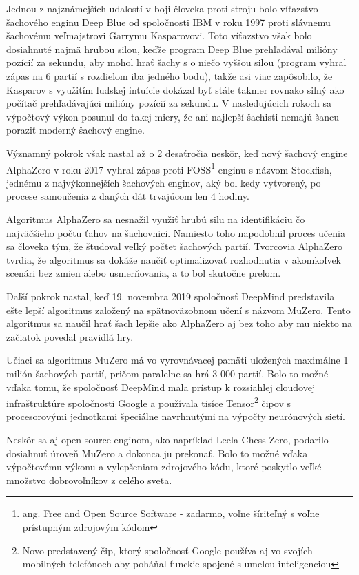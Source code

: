 \documentclass[10pt,oneside,slovak,a4paper]{article}
\begin{document}
Jednou z najznámejších udalostí v boji človeka proti stroju bolo víťazstvo šachového enginu Deep Blue od spoločnosti IBM v roku 1997 proti slávnemu šachovému veľmajstrovi Garrymu Kasparovovi. Toto víťazstvo však bolo dosiahnuté najmä hrubou silou, keďže program Deep Blue prehľadával milióny pozícií za sekundu, aby mohol hrať šachy s o niečo vyššou silou (program vyhral zápas na 6 partií s rozdielom iba jedného bodu), takže asi viac zapôsobilo, že Kasparov s využitím ľudskej intuície dokázal byť stále takmer rovnako silný ako počítač prehľadávajúci milióny pozícií za sekundu. V nasledujúcich rokoch sa výpočtový výkon posunul do takej miery, že ani najlepší šachisti nemajú šancu poraziť moderný šachový engine.\cite{IM20}

Významný pokrok však nastal až o 2 desaťročia neskôr, keď nový šachový engine AlphaZero v roku 2017 vyhral zápas proti FOSS\footnote{ang. Free and Open Source Software - zadarmo, voľne šíriteľný s voľne prístupným zdrojovým kódom} enginu s názvom Stockfish, jednému z najvýkonnejších šachových enginov, aký bol kedy vytvorený, po procese samoučenia z daných dát trvajúcom len 4 hodiny.

Algoritmus AlphaZero sa nesnažil využiť hrubú silu na identifikáciu čo najväčšieho počtu ťahov na šachovnici. Namiesto toho napodobnil proces učenia sa človeka tým, že študoval veľký počtet šachových partií. Tvorcovia AlphaZero tvrdia, že algoritmus sa dokáže naučiť optimalizovať rozhodnutia v akomkoľvek scenári bez zmien alebo usmerňovania, a to bol skutočne prelom.\cite{IM20}

Daľší pokrok nastal, keď 19. novembra 2019 spoločnosť DeepMind predstavila ešte lepší algoritmus založený na spätnoväzobnom učení s názvom MuZero. Tento algoritmus sa naučil hrať šach lepšie ako AlphaZero aj bez toho aby mu niekto na začiatok povedal pravidlá hry.

Učiaci sa algoritmus MuZero má vo vyrovnávacej pamäti uložených maximálne 1 milión šachových partií, pričom paralelne sa hrá 3 000 partií.\cite{IM20} Bolo to možné vďaka tomu, že spoločnosť DeepMind mala prístup k rozsiahlej cloudovej infraštruktúre spoločnosti Google a používala tisíce Tensor\footnote{Novo predstavený čip, ktorý spoločnosť Google používa aj vo svojích mobilných telefónoch aby poháňal funckie spojené s umelou inteligenciou} čipov s procesorovými jednotkami špeciálne navrhnutými na výpočty neurónových sietí.

Neskôr sa aj open-source enginom, ako napríklad Leela Chess Zero, podarilo dosiahnuť úroveň MuZero a dokonca ju prekonať. Bolo to možné vďaka výpočtovému výkonu a vylepšeniam zdrojového kódu, ktoré poskytlo veľké množstvo dobrovoľníkov z celého sveta.
\end{document}
